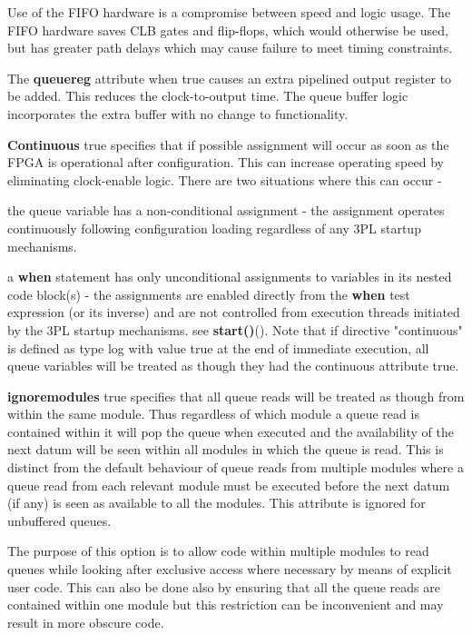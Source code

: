         Use of the FIFO hardware is a compromise between speed and logic
        usage. The FIFO hardware saves CLB gates and flip-flops, which would
        otherwise be used, but has greater path delays which may cause
        failure to meet timing constraints.
        
        The {\bf queuereg} attribute when true causes an extra pipelined output
        register to be added. This reduces the clock-to-output time. The queue
        buffer logic incorporates the extra buffer with no change to
        functionality.

        {\bf Continuous} true specifies that if possible assignment will occur
        as soon as the FPGA is operational after configuration. This can
        increase operating speed by eliminating clock-enable logic. There are
        two situations where this can occur -
        \blist
        \item   the queue variable has a non-conditional assignment - the
                assignment operates continuously following configuration loading
                regardless of any 3PL startup mechanisms.
        \item   a {\bf when} statement has only unconditional assignments to
                variables in its nested code block(s) - the assignments are
                enabled directly from the {\bf when} test expression (or its
                inverse) and are not controlled from execution threads
                initiated by the 3PL startup mechanisms.
        \blend
        see {\bf start()}().
        Note that if directive "continuous" is defined as type log with
        value true at the end of immediate execution, all queue variables
        will be treated as though they had the continuous attribute true.

        {\bf ignoremodules} true specifies that all queue reads will be
        treated as though from within the same module. Thus regardless of
        which module a queue read is contained within it will pop the queue
        when executed and the availability of the next datum will be seen
        within all modules in which the queue is read. This is distinct from
        the default behaviour of queue reads from multiple modules where a
        queue read from each relevant module must be executed before the next
        datum (if any) is seen as available to all the modules. This attribute
        is ignored for unbuffered queues.
        
        The purpose of this option is to allow code within multiple modules
        to read queues while looking after exclusive access where necessary
        by means of explicit user code. This can also be done also by ensuring
        that all the queue reads are contained within one module but this
        restriction can be inconvenient and may result in more obscure code.
        
